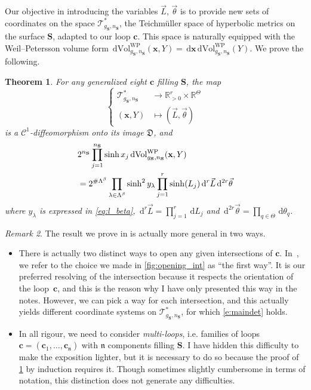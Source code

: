 \documentclass[12pt,twoside]{article}
\theoremstyle{theorem}
\newtheorem{thm}{Theorem}[section]
\theoremstyle{remark}
\newtheorem{rem}[thm]{Remark}
\theoremstyle{definition}
\theoremstyle{example}
\newcommand{\R}{\mathbb{R}}
\renewcommand{\d}{\, \mathrm{d}}
\newcommand{\x}{\mathbf{x}}
\newcommand{\1}[1]{\mathds{1}_{#1}}
\let\div\relax
\newcommand{\div}[1]{\left(\frac{#1}{2}\right)}
\newcommand{\cT}{\mathcal{T}}
\newcommand{\Sf}{\mathbf{S}}
\newcommand{\g}{g_{\mathbf{S}}}
\newcommand{\n}{n_{\mathbf{S}}}
\newcommand{\domain}{\mathfrak{D}}
\newcommand{\cc}{\mathfrak{n}}
\newcommand{\curve}{\mathbf{c}}
\newcommand{\Lambdabeta}{\Lambda^\beta}
\begin{document}
Our objective in introducing the variables $\vec{L}$, $\vec{\theta}$ is to provide new sets of
coordinates on the space $\cT_{\g,\n}^*$, the Teichm\"uller space of hyperbolic metrics on the
surface $\Sf$, adapted to our loop $\curve$. This space is naturally equipped with the
Weil--Petersson volume form
$\d \mathrm{Vol}^{\mathrm{WP}}_{\g, \n}(\x,Y) = \d \x \d \mathrm{Vol}^{\mathrm{WP}}_{\g, \n}(Y)$. We
prove the following.


\begin{thm}\label{t:maindet}
  For any generalized eight $\mathbf{c}$ filling $\Sf$,
  the map
  \begin{equation}
    \label{eq:ch_var}
    \begin{cases}
      \cT^*_{\g, \n} & \rightarrow \R_{>0}^{r} \times \R^\Theta \\
      (\x, Y) & \mapsto (\vec{L}, \vec{\theta})
    \end{cases}
  \end{equation}
  is a $\mathcal{C}^1$-diffeomorphism onto its image $\domain$,
  and
  \begin{equation}\label{e:maindet}
    \begin{split}
     & 2^{\n}\prod_{j=1}^{\n} \sinh\div{x_j} \d \mathrm{Vol}^{\mathrm{WP}}_{\g, \n}(\x,Y)\\
     & = 2^{\# \Lambdabeta} \prod_{\lambda \in \Lambdabeta} \sinh^2\div{y_\lambda} \prod_{j=1}^r \sinh(L_j) \d^r \vec{L} \d^{2r}
      \vec{\theta}
    \end{split}
  \end{equation}
  where $y_\lambda$ is expressed in \eqref{eq:l_beta}, $\d^r \vec{L}=\prod_{j=1}^r \d L_j$ and
  $\d^{2r} \vec{\theta}=\prod_{q \in \Theta} \d \theta_q$.  %
\end{thm}

\begin{rem}
  The result we prove in \cite{anantharaman2025} is actually more general in two ways.
  \begin{itemize}
  \item There is actually two distinct ways to open any given intersections of
    $\curve$. In~\cite{anantharaman2025}, we refer to the choice we made in \cref{fig:opening_int}
    as ``the first way''. It is our preferred resolving of the intersection because it respects the
    orientation of the loop~$\curve$, and this is the reason why I have only presented this way in
    the notes. However, we can pick a way for each intersection, and this actually yields different
    coordinate systems on $\cT_{\g,\n}^*$, for which \eqref{e:maindet} holds.
  \item In all rigour, we need to consider \emph{multi-loops}, i.e. families of loops
    $\curve = (\curve_1, \ldots, \curve_\cc)$ with $\cc$ components filling $\Sf$. I have hidden
    this difficulty to make the exposition lighter, but it is necessary to do so because the proof
    of \cref{t:maindet} by induction requires it. Though sometimes slightly cumbersome in terms of
    notation, this distinction does not generate any difficulties.
  \end{itemize}
\end{rem}
\end{document}
